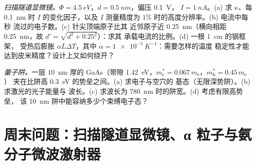 \begin{exercise}[$\star\star\star$]\label{exo:b2:potential-wells-tunneling:11}
\emph{扫描隧道显微镜。}$\Phi = \qty{4.5}{eV}$，$d = \qty{0.5}{nm}$，偏压 \qty{0.1}{V}，
$I = \qty{1}{nA}$。(a) 求 $\kappa$、每 \qty{0.1}{nm} 时 $I$ 的变化因子，以及
$I$ 测量精度为 $1\%$ 时的高度分辨率。(b) 电流中每秒
流过的电子数。(c) 针尖顶端原子比其
近邻原子近 \qty{0.25}{nm}（横向相距 \qty{0.25}{nm}，故 $d' = \sqrt{d^2 + 0.25^2}$）：求其
承载电流的比例。(d) 一根 \qty{1}{cm} 的钢框架，
受热后膨胀 $\alpha L\Delta T$，其中 $\alpha = \qty{1e-5}{K^{-1}}$：需要怎样的温度
稳定性才能达到皮米精度？设计上又如何绕开？
\end{exercise}

\begin{exercise}[$\star\star\star$]\label{exo:b2:potential-wells-tunneling:12}
\emph{量子阱。}一层 \qty{10}{nm} 厚的 GaAs（带隙
\qty{1.42}{eV}，$m_{\text{e}}^* = 0.067\,m_{\text{e}}$，$m_{\text{h}}^* = 0.45\,m_{\text{e}}$）
夹在比阱高 \qty{0.3}{eV} 的势垒之间。(a) 求电子与空穴的
基态（无限深势阱）。(b) 求激光的光子能量与
波长。(c) 求波长为 \qty{780}{nm} 时的阱宽。(d) 考虑有限高势垒，
该 \qty{10}{nm} 阱中能容纳多少个束缚电子态？
\end{exercise}

\section{周末问题：扫描隧道显微镜、α 粒子与氨分子微波激射器}

